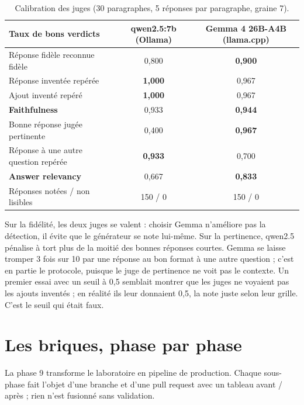 \documentclass[11pt,a4paper]{article}
\begin{document}
\begin{table}[ht]
\centering
\small
\begin{tabular}{@{}l c c@{}}
\toprule
\textbf{Taux de bons verdicts} & \textbf{qwen2.5:7b (Ollama)} & \textbf{Gemma 4 26B-A4B (llama.cpp)} \\
\midrule
Réponse fidèle reconnue fidèle & 0,800 & \textbf{0,900} \\
Réponse inventée repérée & \textbf{1,000} & 0,967 \\
Ajout inventé repéré & \textbf{1,000} & 0,967 \\
\textbf{Faithfulness} & 0,933 & \textbf{0,944} \\
\midrule
Bonne réponse jugée pertinente & 0,400 & \textbf{0,967} \\
Réponse à une autre question repérée & \textbf{0,933} & 0,700 \\
\textbf{Answer relevancy} & 0,667 & \textbf{0,833} \\
\midrule
Réponses notées / non lisibles & 150 / 0 & 150 / 0 \\
\bottomrule
\end{tabular}
\caption{Calibration des juges (30 paragraphes, 5 réponses par paragraphe, graine 7).}
\label{tab:calibration}
\end{table}

Sur la fidélité, les deux juges se valent : choisir Gemma n'améliore pas la détection, il évite que le générateur se note lui-même. Sur la pertinence, qwen2.5 pénalise à tort plus de la moitié des bonnes réponses courtes. Gemma se laisse tromper 3 fois sur 10 par une réponse au bon format à une autre question ; c'est en partie le protocole, puisque le juge de pertinence ne voit pas le contexte. Un premier essai avec un seuil à 0,5 semblait montrer que les juges ne voyaient pas les ajouts inventés ; en réalité ils leur donnaient 0,5, la note juste selon leur grille. C'est le seuil qui était faux.

\section{Les briques, phase par phase}

La phase 9 transforme le laboratoire en pipeline de production. Chaque sous-phase fait l'objet d'une branche et d'une pull request avec un tableau avant / après ; rien n'est fusionné sans validation.
\end{document}
